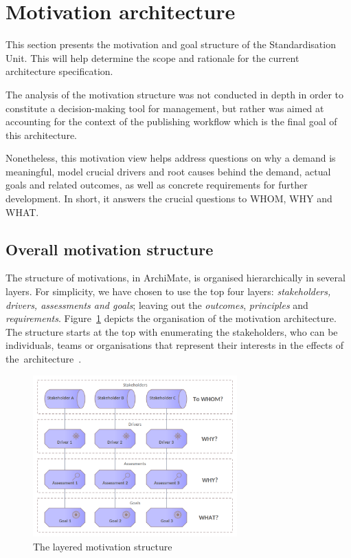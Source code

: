 \section{Motivation architecture}
\label{sec:motivation-architecture}

	This section presents the motivation and goal structure of the Standardisation Unit. This will help determine the scope and rationale for the current architecture specification. 
	
	The analysis of the motivation structure was not conducted in depth in order to constitute a decision-making tool for management, but rather was aimed at accounting for the context of the publishing workflow which is the final goal of this architecture.
	
	Nonetheless, this motivation view helps address questions on why a demand is meaningful, model crucial drivers and root causes behind the demand, actual goals and related outcomes, as well as concrete requirements for further development. In short, it answers the crucial questions to WHOM, WHY and WHAT.
	
	\subsection{Overall motivation structure}
	\label{sec:how-to-motivation}		
	
	The structure of motivations, in ArchiMate, is organised hierarchically in several layers. For simplicity, we have chosen to use the top four layers: \textit{stakeholders, drivers, assessments and goals}; leaving out the \textit{outcomes}, \textit{principles} and \textit{requirements}. \mbox{Figure \ref{fig:morivation-structure}} depicts the organisation of the motivation architecture. The structure starts at the top with enumerating the stakeholders, who can be individuals, teams or organisations that represent their interests in the effects of \mbox{the architecture \citep{archimate3.1}}. 
	
	\begin{figure}[h]
		\centering
		\includegraphics[width=0.7\textwidth]{images/views/Motivation view.png}
		\caption{The layered motivation structure}
		\label{fig:morivation-structure}
	\end{figure}
	
